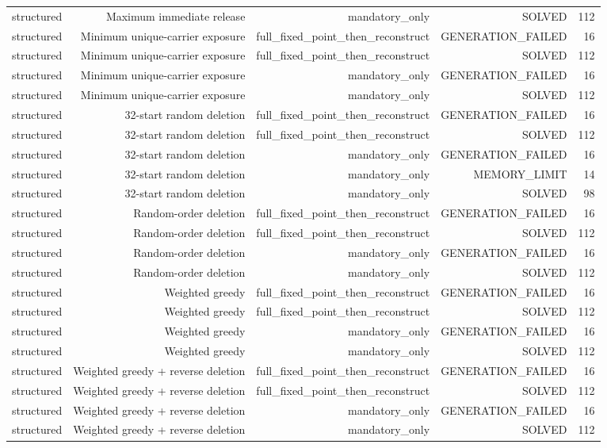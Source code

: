 {\begin{longtable}{lrrrr}
structured & Maximum immediate release & mandatory\_only & SOLVED & 112 \\
structured & Minimum unique-carrier exposure & full\_fixed\_point\_then\_reconstruct & GENERATION\_FAILED & 16 \\
structured & Minimum unique-carrier exposure & full\_fixed\_point\_then\_reconstruct & SOLVED & 112 \\
structured & Minimum unique-carrier exposure & mandatory\_only & GENERATION\_FAILED & 16 \\
structured & Minimum unique-carrier exposure & mandatory\_only & SOLVED & 112 \\
structured & 32-start random deletion & full\_fixed\_point\_then\_reconstruct & GENERATION\_FAILED & 16 \\
structured & 32-start random deletion & full\_fixed\_point\_then\_reconstruct & SOLVED & 112 \\
structured & 32-start random deletion & mandatory\_only & GENERATION\_FAILED & 16 \\
structured & 32-start random deletion & mandatory\_only & MEMORY\_LIMIT & 14 \\
structured & 32-start random deletion & mandatory\_only & SOLVED & 98 \\
structured & Random-order deletion & full\_fixed\_point\_then\_reconstruct & GENERATION\_FAILED & 16 \\
structured & Random-order deletion & full\_fixed\_point\_then\_reconstruct & SOLVED & 112 \\
structured & Random-order deletion & mandatory\_only & GENERATION\_FAILED & 16 \\
structured & Random-order deletion & mandatory\_only & SOLVED & 112 \\
structured & Weighted greedy & full\_fixed\_point\_then\_reconstruct & GENERATION\_FAILED & 16 \\
structured & Weighted greedy & full\_fixed\_point\_then\_reconstruct & SOLVED & 112 \\
structured & Weighted greedy & mandatory\_only & GENERATION\_FAILED & 16 \\
structured & Weighted greedy & mandatory\_only & SOLVED & 112 \\
structured & Weighted greedy + reverse deletion & full\_fixed\_point\_then\_reconstruct & GENERATION\_FAILED & 16 \\
structured & Weighted greedy + reverse deletion & full\_fixed\_point\_then\_reconstruct & SOLVED & 112 \\
structured & Weighted greedy + reverse deletion & mandatory\_only & GENERATION\_FAILED & 16 \\
structured & Weighted greedy + reverse deletion & mandatory\_only & SOLVED & 112 \\
\bottomrule
\end{longtable}
}

